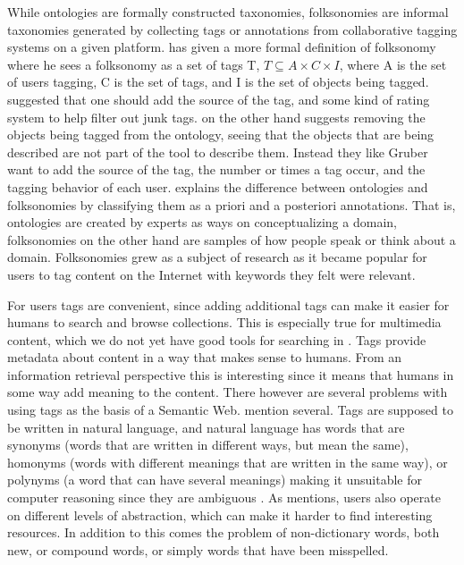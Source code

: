 While ontologies are formally constructed taxonomies, folksonomies are informal taxonomies generated by collecting tags or annotations from collaborative tagging systems on a given platform\citep{Tang2009}.
\citet{Mika2005} has given a more formal definition of folksonomy where he sees a folksonomy as a set of tags T,
$T \subseteq A \times C \times I$, where A is the set of users tagging, C is the set of tags, and I is the set of objects being tagged.
\citet{Gruber2007} suggested that one should add the source of the tag, and some kind of rating system to help filter out junk tags.
\citet{Scerri2008} on the other hand suggests removing the objects being tagged from the ontology,
seeing that the objects that are being described are not part of the tool to describe them.
Instead they like Gruber want to add the source of the tag, the number or times a tag occur, and the tagging behavior of each user.
\citet{Bang2008} explains the difference between ontologies and folksonomies by classifying them as a priori and a posteriori annotations.
That is, ontologies are created by experts as ways on conceptualizing a domain, folksonomies on the other hand are samples of how people speak or think about a domain.
Folksonomies grew as a subject of research as it became popular for users to tag content on the Internet with keywords they felt were relevant.

For users tags are convenient, since adding additional tags can make it easier for humans to search and browse collections.
This is especially true for multimedia content, which we do not yet have good tools for searching in \citep{Weinberger2008}.
Tags provide metadata about content in a way that makes sense to humans.
From an information retrieval perspective this is interesting since it means that humans in some way add meaning to the content.
There however are several problems with using tags as the basis of a Semantic Web.
\citet{Tang2009} mention several.
Tags are supposed to be written in natural language, and natural language has words that are synonyms (words that are written in different ways,
but mean the same), homonyms (words with different meanings that are written in the same way), or polynyms (a word that can have several meanings)
making it unsuitable for computer reasoning since they are ambiguous \citep{Passant2008}.
As \citet{Golder2005} mentions, users also operate on different levels of abstraction, which can make it harder to find interesting resources.
In addition to this comes the problem of non-dictionary words, both new, or compound words, or simply words that have been misspelled\citep{Tonkin2006}.

